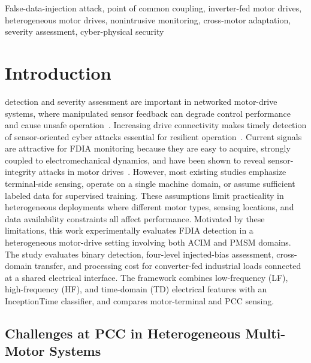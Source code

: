 \documentclass[letterpaper,journal]{IEEEtran}
\begin{document}
\begin{IEEEkeywords}
False-data-injection attack, point of common coupling, inverter-fed motor drives, heterogeneous motor drives, nonintrusive monitoring, cross-motor adaptation, severity assessment, cyber-physical security
\end{IEEEkeywords}

\section{Introduction}
\label{sec:introduction}
 
 detection and severity assessment are important in networked motor-drive systems, where manipulated sensor feedback can degrade control performance and cause unsafe operation~\cite{Ghaderi2021A}. Increasing drive connectivity makes timely detection of sensor-oriented cyber attacks essential for resilient operation~\cite{Yang2022Fast,Yang2024Enhanced}.
Current signals are attractive for FDIA monitoring because they are easy to acquire, strongly coupled to electromechanical dynamics, and have been shown to reveal sensor-integrity attacks in motor drives~\cite{7944701, YangVulnerability}. However, most existing studies emphasize terminal-side sensing, operate on a single machine domain, or assume sufficient labeled data for supervised training. These assumptions limit practicality in heterogeneous deployments where different motor types, sensing locations, and data availability constraints all affect performance.
Motivated by these limitations, this work experimentally evaluates FDIA detection in a heterogeneous motor-drive setting involving both ACIM and PMSM domains. The study evaluates binary detection, four-level injected-bias assessment, cross-domain transfer, and processing cost for converter-fed industrial loads connected at a shared electrical interface. The framework combines low-frequency (LF), high-frequency (HF), and time-domain (TD) electrical features with an InceptionTime classifier, and compares motor-terminal and PCC sensing.

\subsection{Challenges at PCC in Heterogeneous Multi-Motor Systems}
\label{sec:pcc_challenges}
\end{document}
